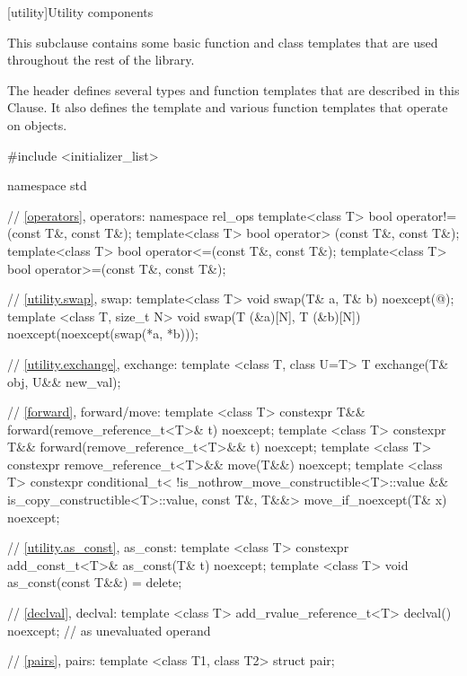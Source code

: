 [utility]{Utility components}

\pnum
This subclause contains some basic function and class templates that are used
throughout the rest of the library.

%
%

\pnum
The header  defines several types and function templates
that are described in this Clause. It also defines the template 
and various function templates that operate on  objects.

\begin{codeblock}
#include <initializer_list>

namespace std {
  // \ref{operators}, operators:
  namespace rel_ops {
    template<class T> bool operator!=(const T&, const T&);
    template<class T> bool operator> (const T&, const T&);
    template<class T> bool operator<=(const T&, const T&);
    template<class T> bool operator>=(const T&, const T&);
  }

  // \ref{utility.swap}, swap:
  template<class T> void swap(T& a, T& b) noexcept(@\seebelow@);
  template <class T, size_t N> void swap(T (&a)[N], T (&b)[N]) noexcept(noexcept(swap(*a, *b)));

  // \ref{utility.exchange}, exchange:
  template <class T, class U=T> T exchange(T& obj, U&& new_val);

  // \ref{forward}, forward/move:
  template <class T> 
    constexpr T&& forward(remove_reference_t<T>& t) noexcept;
  template <class T>
    constexpr T&& forward(remove_reference_t<T>&& t) noexcept;
  template <class T>
    constexpr remove_reference_t<T>&& move(T&&) noexcept;
  template <class T>
    constexpr conditional_t<
    !is_nothrow_move_constructible<T>::value && is_copy_constructible<T>::value,
    const T&, T&&> move_if_noexcept(T& x) noexcept;

  // \ref{utility.as_const}, as_const:
  template <class T> constexpr add_const_t<T>& as_const(T& t) noexcept;
  template <class T> void as_const(const T&&) = delete;

  // \ref{declval}, declval:
  template <class T>
    add_rvalue_reference_t<T> declval() noexcept;  // as unevaluated operand

  // \ref{pairs}, pairs:
  template <class T1, class T2> struct pair;

}
\end{codeblock}
